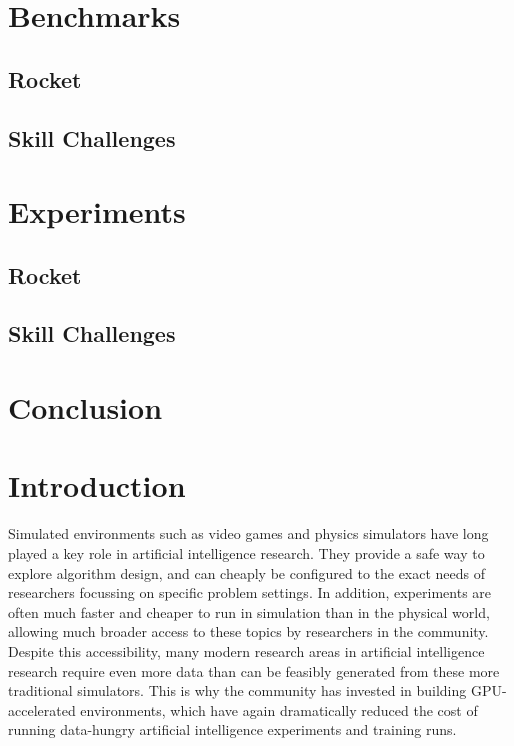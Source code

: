 \documentclass{article}
\begin{document}
\section{Benchmarks}

\subsection{Rocket}

\subsection{Skill Challenges}


\section{Experiments}
\subsection{Rocket}


\subsection{Skill Challenges}


\section{Conclusion}





\section{Introduction}


Simulated environments such as video games and physics simulators have long played a key role in artificial intelligence research.
They provide a safe way to explore algorithm design, and can cheaply be configured to the exact needs of researchers focussing on specific problem settings.
In addition, experiments are often much faster and cheaper to run in simulation than in the physical world, allowing much broader access to these topics by researchers in the community.
Despite this accessibility, many modern research areas in artificial intelligence research require even more data than can be feasibly generated from these more traditional simulators. 
This is why the community has invested in building GPU-accelerated environments, which have again dramatically reduced the cost of running data-hungry artificial intelligence experiments and training runs.
\end{document}
